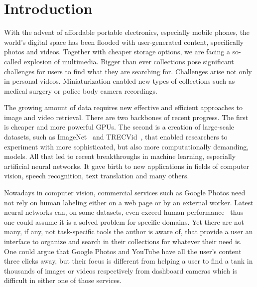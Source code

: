 \chapter*{Introduction}


With the advent of affordable portable electronics, especially mobile phones, the world's digital space has been flooded with user-generated content, specifically photos and videos. Together with cheaper storage options, we are facing a so-called explosion of multimedia. Bigger than ever collections pose significant challenges for users to find what they are searching for. Challenges arise not only in personal videos. Miniaturization enabled new types of collections such as medical surgery or police body camera recordings.

The growing amount of data requires new effective and efficient approaches to image and video retrieval. There are two backbones of recent progress. The first is cheaper and more powerful GPUs. The second is a creation of large-scale datasets, such as ImageNet~\cite{ILSVRC15} and TRECVid~\cite{2017trecvidawad}, that enabled researchers to experiment with more sophisticated, but also more computationally demanding, models. All that led to recent breakthroughs in machine learning, especially artificial neural networks. It gave birth to new applications in fields of computer vision, speech recognition, text translation and many others.

Nowadays in computer vision, commercial services such as Google Photos need not rely on human labeling either on a web page or by an external worker. Latest neural networks can, on some datasets, even exceed human performance~\cite{he2015delving} thus one could assume it is a solved problem for specific domains. Yet there are not many, if any, not task-specific tools the author is aware of, that provide a user an interface to organize and search in their collections for whatever their need is. One could argue that Google Photos and YouTube have all the user's content three clicks away, but their focus is different from helping a user to find a tank in thousands of images or videos respectively from dashboard cameras which is difficult in either one of those services.

